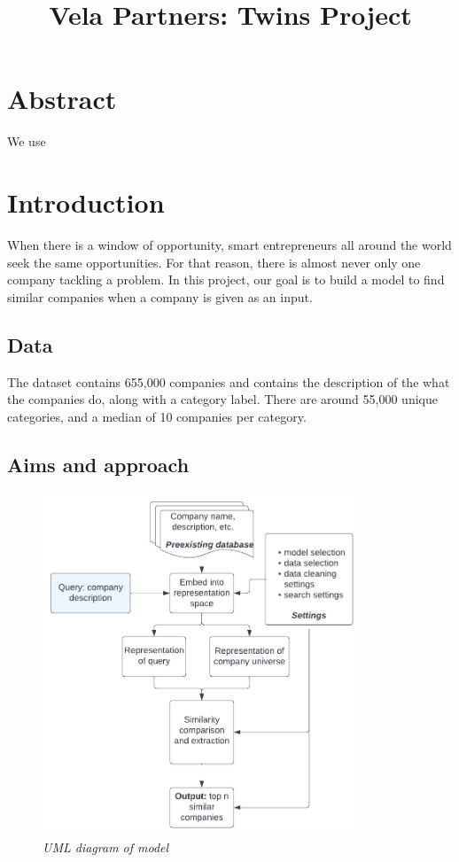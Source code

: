 \documentclass[a4paper]{article}
\title{Vela Partners: Twins Project}
\begin{document}
\maketitle
\tableofcontents
\section{Abstract}
We use 
\section{Introduction}
When there is a window of opportunity, smart entrepreneurs all around the world
seek the same opportunities. For that reason, there is almost never only one
company tackling a problem. In this project, our goal is to build a model to
find similar companies when a company is given as an input.
\subsection{Data}
The dataset contains 655,000 companies and contains the description of the
what the companies do, along with a category label. There are around 55,000
unique categories, and a median of 10 companies per category.
\subsection{Aims and approach}

\begin{figure}[!h]
    \centerline{\includegraphics[width=95mm]{uml.jpeg}} \caption{{\it UML
    diagram of model}}
    \label{setup}
\end{figure}
\end{document}
